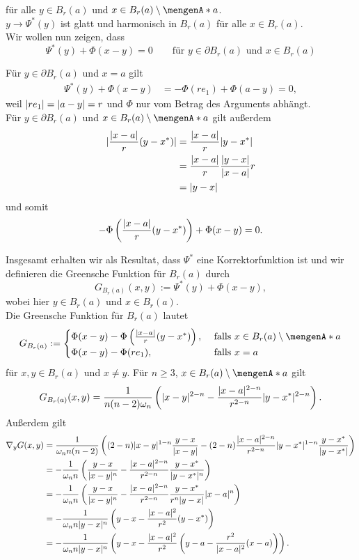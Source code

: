 für alle $y \in B_r(a)$ und $x \in B_r(a) \setminus \set{a}$. \\
$y \to \Psi^*(y)$ ist glatt und harmonisch in $B_r(a)$ für alle $x \in B_r(a)$. \\
Wir wollen nun zeigen, dass \[
	\Psi^*(y) + \Phi(x-y)=0 \qquad \text{für } y \in \partial B_r(a) \text{ und } x \in B_r(a)
\]
\begin{beweis}
	Für $y \in \partial B_r(a)$ und $x = a$ gilt
	\begin{align*}
		\Psi^*(y)+ \Phi(x-y) &= - \Phi(re_1) + \Phi(a-y) = 0,
	\end{align*}
	weil $\lvert re_1\rvert = \lvert a-y\rvert = r$ und $\Phi$ nur vom Betrag des Arguments abhängt. \\
	Für $y \in \partial B_r(a)$ und $x \in B_r(a) \setminus \set{a}$ gilt außerdem
	\begin{align*}
		\lvert\frac{\lvert x-a\rvert}{r}(y-x^*)\rvert &= \frac{\lvert x-a\rvert}{r} \lvert y-x^*\rvert \\
		&= \frac{\lvert x-a\rvert}{r} \frac{\lvert y-x\rvert}{\lvert x-a\rvert}r  \\ 
		&= \lvert y-x\rvert
	\end{align*}
	und somit
	\[
		- \Phi \left( \frac{\lvert x-a\rvert}{r}(y-x^*) \right) + \Phi(x-y)= 0.
	\]
	\end{beweis}
	Insgesamt erhalten wir als Resultat, dass $\Psi^*$ eine Korrektorfunktion ist und wir definieren die Greensche Funktion für $B_r(a)$ durch
	\[
		G_{B_r(a)}(x,y) := \Psi^*(y) + \Phi(x-y),
	\]
	wobei hier $y \in B_r(a)$ und $x \in B_r(a)$. \\
	Die Greensche Funktion für $B_r(a)$ lautet
	\[
		G_{B_r(a)} := \begin{cases}
			 \Phi(x-y)- \Phi \left( \frac{\abs{x-a}}{r}(y-x^*) \right) , &\text{ falls }x \in B_r(a) \setminus \set{a}\\
			 \Phi(x-y)- \Phi(re_1) , &\text{ falls }x =a
		\end{cases}
	\]
	für $x,y \in B_r(a)$ und $x \neq y$. Für $n \geq 3$, $x \in  B_r(a) \setminus \set{a}$ gilt
	\[
		G_{B_r(a)}(x,y) = \frac{1}{n (n-2) \omega_n} \left( \lvert x-y\rvert^{2-n} - \frac{ \lvert x-a\rvert^{2-n}}{r^{2-n}} \lvert y - x^*\rvert^{2-n} \right).
	\]
	Außerdem gilt
	\begin{align*}
		 \nabla_y G(x,y) &= \frac{1}{\omega_n n(n-2)} \left( (2-n) \lvert x-y\rvert^{1-n} \frac{y-x}{\lvert x-y\rvert} 
		 - (2-n) \frac{\lvert x-a\rvert^{2-n}}{r ^{2-n}} \lvert y-x^*\rvert^{1-n} \frac{y-x^*}{\lvert y-x^*\rvert} \right) \\
		 &= - \frac{1}{\omega_nn} \left( \frac{y-x}{\lvert x-y\rvert^n} - \frac{\lvert x-a\rvert^{2-n}}{r^{2-n}} \frac{y- x^*}{\lvert y- x^*\rvert^n} \right) \\
		 &= - \frac{1}{\omega_nn} \left( \frac{y-x}{\lvert x-y\rvert^n} - \frac{\lvert x-a\rvert^{2-n}}{r^{2-n}} \frac{y-x^*}{r^n \lvert y-x\rvert} \lvert x-a\rvert^n \right) \\
		 &= - \frac{1}{\omega_n n \lvert y-x\rvert^n} \left( y-x - \frac{\lvert x-a\rvert^2}{r^2}(y-x^*) \right) \\
		 &= - \frac{1}{\omega_n n \lvert y-x\rvert^n} \left( y-x - \frac{\lvert x-a\rvert^2}{r^2} \left( y - a - \frac{r^2}{\lvert x-a\rvert^2}(x-a) \right) \right).
	\end{align*}
